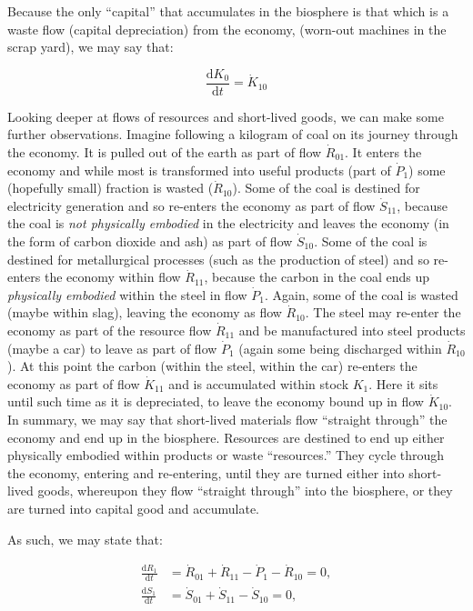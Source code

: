 Because the only ``capital'' that accumulates 
in the biosphere
is that which is a waste flow 
(capital depreciation)
from the economy,
(worn-out machines in the scrap yard),
we may say that:

\begin{equation} \label{eq:A_K0_balance}
	\frac{\mathrm{d}K_{0}}{\mathrm{d}t}		
	= \dot{K}_{10}
\end{equation}

Looking deeper at flows of resources and short-lived goods,
we can make some further observations. 
Imagine following a kilogram of coal on its journey through the economy. 
It is pulled out of the earth as part of flow $\dot{R}_{01}$. 
It enters the economy and while most 
is transformed into useful
products (part of $\dot{P}_{1}$) some (hopefully small)
fraction is wasted ($\dot{R}_{10}$).
Some of the coal is destined for electricity generation
and so re-enters the economy as part of flow $\dot{S}_{11}$,
because the coal is \emph{not physically embodied}
in the electricity and leaves the economy
(in the form of carbon dioxide and ash)
as part of flow $\dot{S}_{10}$.
Some of the coal is destined for metallurgical processes 
(such as the production of steel)
and so re-enters the economy within flow $\dot{R}_{11}$,
because the carbon in the coal ends up 
\emph{physically embodied} within the steel in flow $\dot{P}_{1}$.
Again,
some of the coal is wasted (maybe within slag), 
leaving the economy as flow $\dot{R}_{10}$.
The steel may re-enter the economy as part of
the resource flow $\dot{R}_{11}$ and be manufactured
into steel products (maybe a car) to leave as part of
flow $\dot{P}_{1}$
(again some being discharged within $\dot{R}_{10}$).
At this point the carbon 
(within the steel, within the car)
re-enters the economy as part of flow $\dot{K}_{11}$
and is accumulated within stock $K_{1}$.
Here it sits until such time as it is depreciated,
to leave the economy bound up in flow $\dot{K}_{10}$.
In summary, we may say that short-lived materials flow 
``straight through'' the economy and end up in the biosphere. 
 Resources are destined
to end up either physically embodied within products or waste ``resources.''
They cycle through the economy,
entering and re-entering,
until they are turned either into short-lived goods,
whereupon they flow ``straight through'' into the biosphere,
or they are turned into capital good and accumulate.

As such,
we may state that:

\begin{align}
	\frac{\mathrm{d}R_1}{\mathrm{d}t}		&
	= \dot{R}_{01}
	+ \dot{R}_{11}
	- \dot{P}_{1}
	- \dot{R}_{10}
	= 0,															\\
\label{eq:A_S1_balance}
	\frac{\mathrm{d}S_1}{\mathrm{d}t}		&
	= \dot{S}_{01}
	+ \dot{S}_{11}
	- \dot{S}_{10}
	= 0,
\end{align}

